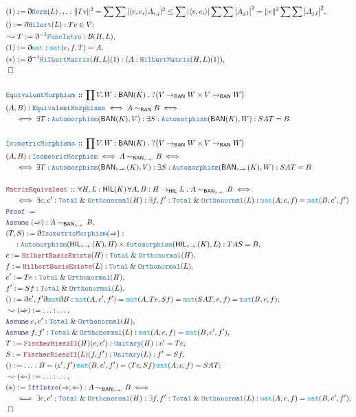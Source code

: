 \documentclass[12pt]{scrartcl}
\newcommand{\TYPE}[1]{\textcolor{NavyBlue}{\mathtt{#1}}}
\newcommand{\FUNC}[1]{\textcolor{Cerulean}{\mathtt{#1}}}
\newcommand{\LOGIC}[1]{\textcolor{Blue}{\mathtt{#1}}}
\newcommand{\THM}[1]{\textcolor{Maroon}{\mathtt{#1}}}
\renewcommand{\.}{\; . \;}
\newcommand{\de}{: \kern 0.1pc =}
\newcommand{\Theorem}[2]{& \THM{#1} \, :: \, #2 \\ & \Proof = \\ }
\newcommand{\DeclareType}[2]{& \TYPE{#1} \, :: \, #2 \\}
\newcommand{\DefineNamedType}[4]{& #1 : \TYPE{#2} \iff #3 \iff #4 \\}
\newcommand{\NewLine}{\\ & \kern 1pc}
\newcommand{\Page}[1]{\begin{align*} #1 \end{align*} \newpage   }
\newcommand{ \bd }{ \ByDef }
\renewcommand{\And}{\; \& \;}
\newcommand{\auto}{\TYPE{Automorphism}}
\newcommand{\Say}[3]{& #1 \de #2 : #3, \\}
\newcommand{\Conclude}[3]{& #1 \de #2 : #3; \\}
\newcommand{\Derive}[3]{& \leadsto #1 \de #2 : #3, \\}
\newcommand{\A}{\LOGIC{Assume} \;}
\newcommand{\Assume}[2]{& \A #1 : #2, \\}
\newcommand{\QED}{\; \square}
\newcommand{\EndProof}{& \QED \\}
\newcommand{\ByDef}{\eth}
\newcommand{\Proof}{\LOGIC{Proof} \; }
\newcommand{\BAN}{\textsf{BAN}}
\newcommand{\BANI}{{\textsf{BAN}_{\circ \to \cdot}}}
\newcommand{\HIL}{\textsf{HIL}}
\newcommand{\HILI}{{\textsf{HIL}_{\circ \to \cdot}}}
\newcommand{\B}{\mathcal{B}}
\begin{document}
\Page{
\Say{(1)}{\bd \TYPE{Norm}(L) \ldots}{ \| Tv \|^2
 = \sum \sum | \langle v, e_i \rangle A_{i,j}  |^2 \le 
 \sum  | \langle v, e_i \rangle | \sum \sum \big| A_{j,l} \big|^2 = \| v \|^2 \sum \sum \big| A_{j,l} \big|^2
}
\Conclude{()}{\bd \TYPE{Hilert}(L)}{ T v \in V}
\Derive{T}{\bd^{-1}\TYPE{FuncIntro}}{\B(H,L)}
\Say{(1)}{\bd \FUNC{mat}}{\FUNC{mat}(e,f,T) = A}
\Say{(*)}{ \bd^{-1} \TYPE{HilbertMatrix}(H,L)(1)}{(A : \TYPE{HilbertMatrix}(H,L)(1))}
\EndProof
\\
\DeclareType{EquivalentMorphism}{ \prod V,W : \BAN(K) \. ? \big( V \to_\BAN W \times V \to_\BAN W
\big)
}
\DefineNamedType{(A,B)}{EquivalentMorphisms}{A \sim_\BAN B}{
\NewLine \iff
\exists T : \auto(\BAN(K),V) :
\exists S : \auto(\BAN(K),W) : SAT = B
 }
 \\
\DeclareType{IsometricMorphisms}{ \prod V,W : \BAN(K) \. ? \big( V \to_\BAN W \times V \to_\BAN W
\big)
}
\DefineNamedType{(A,B)}{IsometricMorphism}{A \sim_{\BANI} B}{
\NewLine \iff
\exists T : \auto(\BANI(K),V) :
\exists S : \auto(\BANI(K),W) : SAT = B
 }
\\
\Theorem{MatrixEquivalent}{\forall H,L : \HIL(K) \, \forall A,B : H \to_\HIL L \. A \sim_{\BANI} B
 \iff 
 \NewLine
 \iff
 \exists e,e' : \TYPE{Total} \And  \TYPE{Orthonormal}(H) : 
 \exists f,f' : \TYPE{Total} \And  \TYPE{Orthonormal}(L) : \FUNC{mat}(A,e,f) = \FUNC{mat}(B,e',f')
}
\Assume{(\Rightarrow)}{ A \sim_{\BANI} B}
\Say{(T,S)}{\bd \TYPE{IsometricMorphism}(\Rightarrow)}{
\NewLine
:\auto(\HILI(K),H) \times \auto(\HILI(K),L) : TAS = B}
\Say{e}{\THM{HilbertBasisExists}(H)}{\TYPE{Total} \And  \TYPE{Orthonormal}(H) }
\Say{f}{\THM{HilbertBasisExists}(L)}{\TYPE{Total} \And  \TYPE{Orthonormal}(L) }
\Say{e'}{Te}{\TYPE{Total} \And  \TYPE{Orthonormal}(H)}
\Say{f'}{Sf}{\TYPE{Total} \And  \TYPE{Orthonormal}(L)}
\Conclude{()}{\bd{e',f'}\bd\FUNC{mat}\bd B}{ \FUNC{mat}(A,e',f') = \FUNC{mat}(A,Te,Sf) = \FUNC{mat}(SAT,e,f) = \FUNC{mat}(B,e,f)}
\Derive{(\Rightarrow)}{\ldots}{\ldots}
\Assume{e,e'}{\TYPE{Total} \And  \TYPE{Orthonormal}(H)}
\Assume{f,f'}{\TYPE{Total} \And  \TYPE{Orthonormal}(L) :
\FUNC{mat}(A,e,f)  = \FUNC{mat}(B,e',f')
 }
\Say{T}{\THM{FischerRieszII}(H)(e,e')}{\TYPE{Unitary}(H) : e' = Te}
\Say{S}{\THM{FischerRieszII}(L)(f,f')}{\TYPE{Unitary}(L) : f' = Sf}
\Conclude{()}{\ldots}{ B = (e',f') \, \FUNC{mat}(B,e',f')
 = (Te,Sf) \, \FUNC{mat}(A,e,f) = SAT
 }
\Derive{(\Leftarrow)}{\ldots}{\ldots}
\Conclude{(*)}{\LOGIC{IffIntro}(\Rightarrow,\Leftarrow)}
{A \sim_{\BANI} B
 \iff 
 \NewLine
 \iff
 \exists e,e' : \TYPE{Total} \And  \TYPE{Orthonormal}(H) : 
 \exists f,f' : \TYPE{Total} \And  \TYPE{Orthonormal}(L) : \FUNC{mat}(A,e,f) = \FUNC{mat}(B,e',f')}
\EndProof
} 
\end{document}
